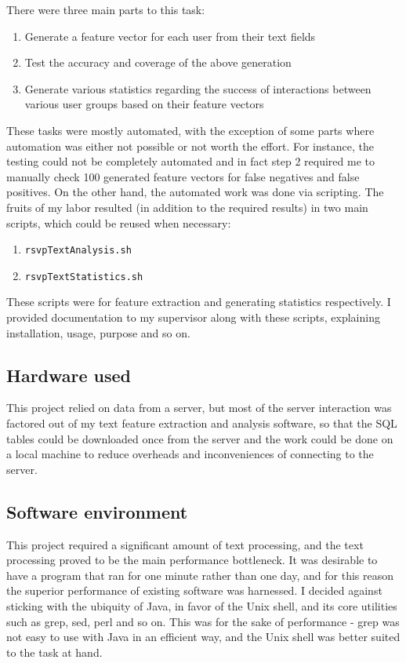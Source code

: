 \documentclass{report}
\begin{document}
There were three main parts to this task:
\begin{enumerate}
  \item Generate a feature vector for each user from their text fields
  \item Test the accuracy and coverage of the above generation
  \item Generate various statistics regarding the success of interactions between various user groups based on their feature vectors
\end{enumerate}

These tasks were mostly automated, with the exception of some parts where automation was either not possible or not worth the effort. For instance, the testing could not be completely automated and in fact step 2 required me to manually check 100 generated feature vectors for false negatives and false positives. On the other hand, the automated work was done via scripting. The fruits of my labor resulted (in addition to the required results) in two main scripts, which could be reused when necessary:
\begin{enumerate}
  \item \begin{verbatim}rsvpTextAnalysis.sh\end{verbatim}
  \item \begin{verbatim}rsvpTextStatistics.sh\end{verbatim}
\end{enumerate}

These scripts were for feature extraction and generating statistics respectively. I provided documentation to my supervisor along with these scripts, explaining installation, usage, purpose and so on.

\subsection{Hardware used}
This project relied on data from a server, but most of the server interaction was factored out of my text feature extraction and analysis software, so that the SQL tables could be downloaded once from the server and the work could be done on a local machine to reduce overheads and inconveniences of connecting to the server.

\subsection{Software environment}
This project required a significant amount of text processing, and the text processing proved to be the main performance bottleneck. It was desirable to have a program that ran for one minute rather than one day, and for this reason the superior performance of existing software was harnessed. I decided against sticking with the ubiquity of Java, in favor of the Unix shell, and its core utilities such as grep, sed, perl and so on. This was for the sake of performance - grep was not easy to use with Java in an efficient way, and the Unix shell was better suited to the task at hand.
\end{document}
